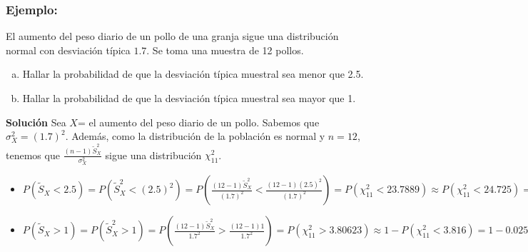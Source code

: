 \begin{frame}
\frametitle{Ejemplo:}
      El aumento del peso diario de un pollo de una granja sigue una
        distribución normal con desviación típica $1.7$. Se toma una
        muestra de 12 pollos.
        \begin{enumerate}[a)]
            \item Hallar la probabilidad de que la desviación típica muestral
            sea menor que 2.5.
            \item Hallar la probabilidad de que la desviación típica
            muestral sea mayor que 1.
            \end{enumerate}
        
\end{frame}
\begin{frame}
\textbf{Solución}
Sea $X$= el aumento del peso diario de un pollo. Sabemos que $\sigma_{X}^2=(1.7)^2$. Además, como la
distribución de la población es normal y $n=12$, tenemos que
$\frac{(n-1)\tilde{S}_{X}^2}{\sigma_{X}^2}$ sigue  una distribución $\chi^2_{11}$.
\begin{itemize}
\item  $P(\tilde{S}_{X}<2.5)=
P(\tilde{S}_{X}^2<(2.5)^2)=P(\frac{(12-1)\tilde{S}_{X}^2}{(1.7)^2}<\frac{(12-1)
(2.5)^2}{(1.7)^2})= P(\chi_{11}^2<23.7889)\approx P(\chi_{11}^2<24.725)=0.99.$
\item
$P(\tilde{S}_{X}>1)=P(\tilde{S}_{X}^2>1)=P(\frac{(12-1)\tilde{S}_{X}^2}{1.7^2}>\frac{(12-1)
1}{1.7^2})=P(\chi_{11}^2>3.80623)\approx 1-P(\chi_{11}^2<3.816)=1-0.025=0.975$
\end{itemize}
\end{frame}
